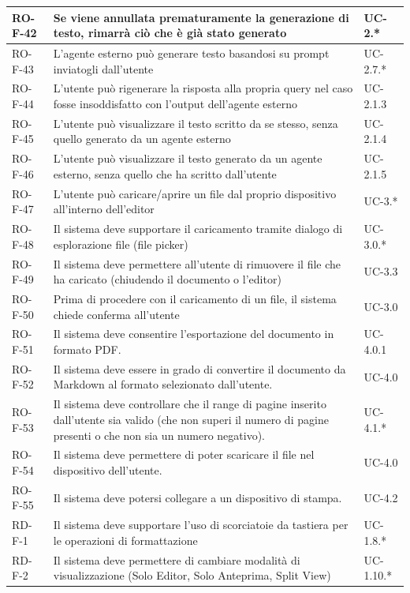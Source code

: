 \documentclass[11pt,a4paper]{article}
\begin{document}
\begin{longtable}{|p{}|>{\raggedright\arraybackslash}p{}|p{}|}
\hline
RO-F-42 & Se viene annullata prematuramente la generazione di testo, rimarrà ciò che è già stato generato & UC-2.* \\
\hline
RO-F-43 & L'agente esterno può generare testo basandosi su prompt inviatogli dall'utente & UC-2.7.* \\
\hline
RO-F-44 & L'utente può rigenerare la risposta alla propria query nel caso fosse insoddisfatto con l'output dell'agente esterno & UC-2.1.3 \\
\hline
RO-F-45 & L'utente può visualizzare il testo scritto da se stesso, senza quello generato da un agente esterno & UC-2.1.4 \\
\hline
RO-F-46 & L'utente può visualizzare il testo generato da un agente esterno, senza quello che ha scritto dall'utente & UC-2.1.5 \\
\hline
RO-F-47 & L'utente può caricare/aprire un file dal proprio dispositivo all'interno dell'editor & UC-3.* \\
\hline
RO-F-48 & Il sistema deve supportare il caricamento tramite dialogo di esplorazione file (file picker) & UC-3.0.* \\
\hline
RO-F-49 & Il sistema deve permettere all'utente di rimuovere il file che ha caricato (chiudendo il documento o l'editor) & UC-3.3 \\
\hline
RO-F-50 & Prima di procedere con il caricamento di un file, il sistema chiede conferma all'utente & UC-3.0 \\
\hline
RO-F-51 & Il sistema deve consentire l'esportazione del documento in formato PDF. & UC-4.0.1\\
\hline
RO-F-52 & Il sistema deve essere in grado di convertire il documento da Markdown al formato selezionato dall'utente. & UC-4.0 \\
\hline
RO-F-53 & Il sistema deve controllare che il range di pagine inserito dall'utente sia valido (che non superi il numero di pagine presenti o che non sia un numero negativo). & UC-4.1.* \\
\hline
RO-F-54 & Il sistema deve permettere di poter scaricare il file nel dispositivo dell'utente. & UC-4.0\\
\hline
RO-F-55 & Il sistema deve potersi collegare a un dispositivo di stampa. & UC-4.2\\
\hline
RD-F-1 & Il sistema deve supportare l'uso di scorciatoie da tastiera per le operazioni di formattazione & UC-1.8.* \\
\hline
RD-F-2 & Il sistema deve permettere di cambiare modalità di visualizzazione (Solo Editor, Solo Anteprima, Split View) & UC-1.10.* \\

\end{longtable}
\end{document}
